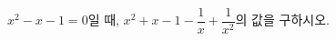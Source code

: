 \hspace*{2mm}\begin{minipage}[t]{\dimexpr\linewidth-2mm\relax}\vspace{0pt}
$x^2-x-1=0$일 때, $x^2+x-1-\dfrac{1}{x}+\dfrac{1}{x^2}$의 값을 구하시오.\end{minipage}
